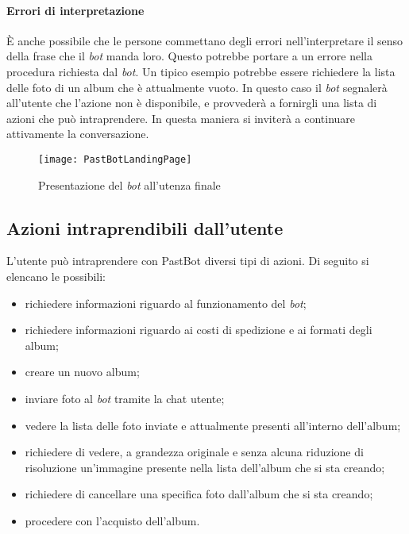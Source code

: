 \paragraph*{Errori di interpretazione} È anche possibile che le persone
commettano degli errori nell'interpretare il senso della frase che il
\textit{bot} manda loro. Questo potrebbe portare a un errore nella procedura
richiesta dal \textit{bot}. Un tipico esempio potrebbe essere richiedere la
lista delle foto di un album che è attualmente vuoto. In questo caso il
\textit{bot} segnalerà all'utente che l'azione non è disponibile, e provvederà
a fornirgli una lista di azioni che può intraprendere. In questa maniera si
inviterà a continuare attivamente la conversazione.

\begin{figure}[H]
  \centering
  \texttt{[image: PastBotLandingPage]}
  \caption{Presentazione del \textit{bot} all'utenza finale}
\end{figure}

\subsection{Azioni intraprendibili dall'utente}

L'utente può intraprendere con PastBot diversi tipi di azioni. Di seguito si
elencano le possibili:

\begin{itemize}

  \item richiedere informazioni riguardo al funzionamento del \textit{bot};
  \item richiedere informazioni riguardo ai costi di spedizione e ai formati
degli album;
  \item creare un nuovo album;
  \item inviare foto al \textit{bot} tramite la chat utente;
  \item vedere la lista delle foto inviate e attualmente presenti all'interno
dell'album;
  \item richiedere di vedere, a grandezza originale e senza alcuna riduzione di
risoluzione un'immagine presente nella lista dell'album che si sta creando;
  \item richiedere di cancellare una specifica foto dall'album che si sta
creando;
  \item procedere con l'acquisto dell'album.
\end{itemize}

